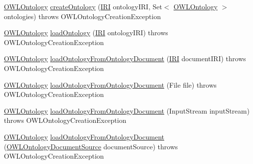 \begin{DoxyCompactItemize}
\item 
\hyperlink{interfaceorg_1_1semanticweb_1_1owlapi_1_1model_1_1_o_w_l_ontology}{O\-W\-L\-Ontology} \hyperlink{interfaceorg_1_1semanticweb_1_1owlapi_1_1model_1_1_o_w_l_ontology_manager_a03f1f92967efe3d4838d07157f2f3895}{create\-Ontology} (\hyperlink{classorg_1_1semanticweb_1_1owlapi_1_1model_1_1_i_r_i}{I\-R\-I} ontology\-I\-R\-I, Set$<$ \hyperlink{interfaceorg_1_1semanticweb_1_1owlapi_1_1model_1_1_o_w_l_ontology}{O\-W\-L\-Ontology} $>$ ontologies)  throws O\-W\-L\-Ontology\-Creation\-Exception
\item 
\hyperlink{interfaceorg_1_1semanticweb_1_1owlapi_1_1model_1_1_o_w_l_ontology}{O\-W\-L\-Ontology} \hyperlink{interfaceorg_1_1semanticweb_1_1owlapi_1_1model_1_1_o_w_l_ontology_manager_a9052d0727f0bce1d7803cc876d638ca0}{load\-Ontology} (\hyperlink{classorg_1_1semanticweb_1_1owlapi_1_1model_1_1_i_r_i}{I\-R\-I} ontology\-I\-R\-I)  throws O\-W\-L\-Ontology\-Creation\-Exception
\item 
\hyperlink{interfaceorg_1_1semanticweb_1_1owlapi_1_1model_1_1_o_w_l_ontology}{O\-W\-L\-Ontology} \hyperlink{interfaceorg_1_1semanticweb_1_1owlapi_1_1model_1_1_o_w_l_ontology_manager_accbb42a9bb5bfc566e51fc81b0e7d386}{load\-Ontology\-From\-Ontology\-Document} (\hyperlink{classorg_1_1semanticweb_1_1owlapi_1_1model_1_1_i_r_i}{I\-R\-I} document\-I\-R\-I)  throws O\-W\-L\-Ontology\-Creation\-Exception
\item 
\hyperlink{interfaceorg_1_1semanticweb_1_1owlapi_1_1model_1_1_o_w_l_ontology}{O\-W\-L\-Ontology} \hyperlink{interfaceorg_1_1semanticweb_1_1owlapi_1_1model_1_1_o_w_l_ontology_manager_a2ee9612211d19965085db486a65b0854}{load\-Ontology\-From\-Ontology\-Document} (File file)  throws O\-W\-L\-Ontology\-Creation\-Exception
\item 
\hyperlink{interfaceorg_1_1semanticweb_1_1owlapi_1_1model_1_1_o_w_l_ontology}{O\-W\-L\-Ontology} \hyperlink{interfaceorg_1_1semanticweb_1_1owlapi_1_1model_1_1_o_w_l_ontology_manager_ab3f51136b6d7cdee2b07ebee20a1d7e8}{load\-Ontology\-From\-Ontology\-Document} (Input\-Stream input\-Stream)  throws O\-W\-L\-Ontology\-Creation\-Exception
\item 
\hyperlink{interfaceorg_1_1semanticweb_1_1owlapi_1_1model_1_1_o_w_l_ontology}{O\-W\-L\-Ontology} \hyperlink{interfaceorg_1_1semanticweb_1_1owlapi_1_1model_1_1_o_w_l_ontology_manager_aad9b6653292ab344f84ecdaf00fdfe24}{load\-Ontology\-From\-Ontology\-Document} (\hyperlink{interfaceorg_1_1semanticweb_1_1owlapi_1_1io_1_1_o_w_l_ontology_document_source}{O\-W\-L\-Ontology\-Document\-Source} document\-Source)  throws O\-W\-L\-Ontology\-Creation\-Exception

\end{DoxyCompactItemize}
